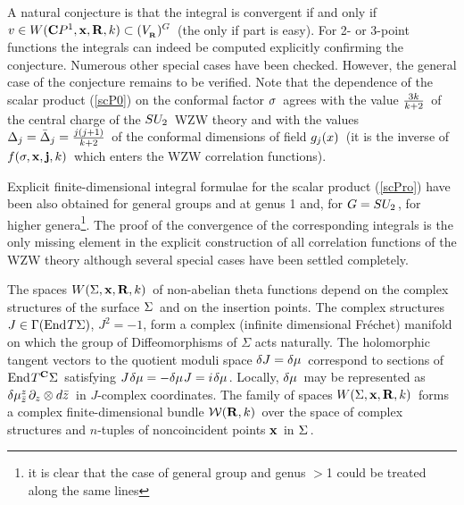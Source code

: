 A natural conjecture is that the integral
is convergent if and only if \s$v\in
W({{\bf C}} P^1,{\bf x},{\bf R},k)\subset(V_{_{{{\bf R}}}})^G\hspace{0.05cm}$
(the only if part is easy). For 2- or 3-point functions
the integrals can indeed be computed explicitly confirming
the conjecture. Numerous other special cases have been
checked. However, the general case of the conjecture
remains to be verified. Note that the dependence of the
scalar product (\ref{scP0}) on the conformal factor
\s$\sigma\hspace{0.05cm}$ agrees with the value \s${3k\over k+2}\hspace{0.05cm}$
of the central charge of the \s$SU_2\hspace{0.05cm}$ WZW theory and
with the values \s$\Delta_j=\bar\Delta_j={j(j+1)\over k+2}\hspace{0.05cm}$
of the conformal dimensions of field \s$g_j(x)\hspace{0.05cm}$
(it is the inverse of \s$f(\sigma,{\bf x},{\bf j},k)\hspace{0.05cm}$
which enters the WZW correlation functions).
\vskip 0.4cm

Explicit finite-dimensional integral formulae for the scalar
product (\ref{scPro}) have been also obtained for general
groups and at genus 1 and, for \s$G=SU_2\hspace{0.025cm}$, \m for higher
genera\footnote{it is clear that the case of general group
and genus $>$1 could be treated along the same lines}.
The proof of the convergence of the corresponding integrals
is the only missing element in the explicit construction
of all correlation functions of the WZW theory although several
special cases have been settled completely.
\eject
\vskip 1cm



\vskip 0.6cm

The spaces \s$W(\Sigma,{{\bf x}},{{\bf R}},k)\hspace{0.05cm}$ of non-abelian
theta functions depend on the complex structures
of the surface \s$\Sigma\hspace{0.05cm}$ and on the insertion points.
The complex structures $J\in\Gamma({\rm End}\hspace{0.025cm} T\Sigma)$,
$J^2=-1$, form a complex (infinite dimensional Fr\'{e}chet)
manifold on which the group of Diffeomorphisms of
$\Sigma$ acts naturally. The holomorphic tangent vectors
to the quotient moduli space \s$\delta J=
\delta\mu\hspace{0.05cm}$ correspond to sections of
\s${\rm End}\hspace{0.025cm} T^{{\bf C}}\Sigma\hspace{0.05cm}$
satisfying \s$J\hspace{0.025cm}\delta\mu=-\delta\mu\hspace{0.025cm} J=i\hspace{0.025cm}\delta\mu\hspace{0.025cm}$.
\m Locally, \s$\delta\mu\hspace{0.05cm}$ may be represented as
\s$\delta\mu^z_{\bar z}\hspace{0.05cm}\partial_z\otimes d\bar z\hspace{0.05cm}$ in
\m$J$-complex coordinates. The family of spaces
\s$W(\Sigma,{{\bf x}},{{\bf R}},k)\hspace{0.05cm}$ forms a complex finite-dimensional
bundle \s${\cal W}({{\bf R}},k)\hspace{0.05cm}$ over the space of complex structures
and \m$n$-tuples of noncoincident points \s${{\bf x}}\hspace{0.025cm}$
in \s$\Sigma\hspace{0.05cm}$.
\vskip 0.3cm

